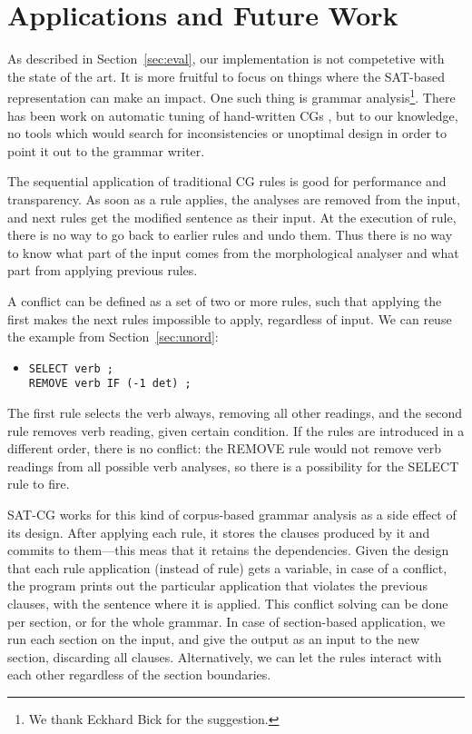 \documentclass[11pt]{article}
\begin{document}
\section{Applications and Future Work}
\label{sec:apps}
As described in Section~\ref{sec:eval}, our implementation is not
competetive with the state of the art. It is more fruitful to focus on
things where the SAT-based representation can make an impact.
One such thing is grammar analysis\footnote{We thank Eckhard Bick for
  the suggestion.}.
There has been work on automatic tuning of hand-written CGs
\cite{bick2013tuning}, but to our knowledge, no tools which would
search for inconsistencies or unoptimal design in order to point it out to the grammar writer.

The sequential application of traditional CG rules is good for
performance and transparency. As soon as a rule applies, the analyses
are removed from the input, and next rules get the modified sentence
as their input. At the execution of rule, there is no way to
go back to earlier rules and undo them. Thus there is no way to know
what part of the input comes from the morphological analyser and what
part from applying previous rules.

A conflict can be defined as 
a set of two or more rules, such that applying the first makes the
next rules impossible to apply, regardless of input.
We can reuse the example from Section~\ref{sec:unord}:

\begin{itemize}
\item [] \texttt{SELECT verb ;} \\
         \texttt{REMOVE verb IF (-1 det) ;}
\end{itemize}

The first rule selects the verb always, removing all other readings,
and the second rule removes verb reading, given certain condition.
If the rules are introduced in a different order, there is no
conflict: the REMOVE rule would not remove verb readings from all
possible verb analyses, so there is a possibility for the SELECT rule
to fire.

SAT-CG works for this kind of corpus-based grammar analysis as a side
effect of its design. After applying each rule, it stores the clauses
produced by it and commits to them---this meas that it retains the
dependencies.
Given the design that each rule application (instead of rule) gets a variable,
in case of a conflict, the program prints out the particular
application that violates the previous clauses, with the sentence
where it is applied. 
This conflict solving can be done per section, or for the whole grammar. 
In case of section-based application, we run each section on the
input, and give the output as an input to the new section, discarding
all clauses. Alternatively, we can let the rules interact with each
other regardless of the section boundaries.
\end{document}
